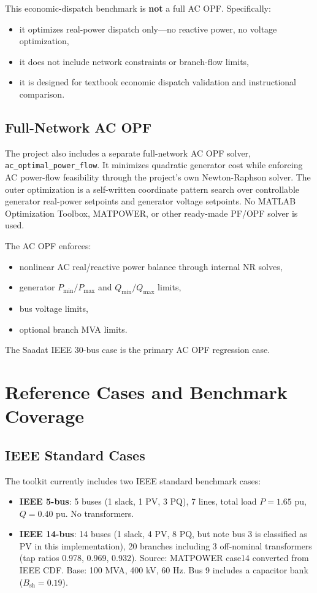 \documentclass[12pt,a4paper]{article}
\begin{document}
This economic-dispatch benchmark is \textbf{not} a full AC OPF. Specifically:
\begin{itemize}[leftmargin=1.5em]
    \item it optimizes real-power dispatch only---no reactive power, no voltage optimization,
    \item it does not include network constraints or branch-flow limits,
    \item it is designed for textbook economic dispatch validation and instructional comparison.
\end{itemize}

\subsection{Full-Network AC OPF}

The project also includes a separate full-network AC OPF solver,
\texttt{ac\_optimal\_power\_flow}. It minimizes quadratic generator cost while
enforcing AC power-flow feasibility through the project's own Newton-Raphson
solver. The outer optimization is a self-written coordinate pattern search over
controllable generator real-power setpoints and generator voltage setpoints.
No MATLAB Optimization Toolbox, MATPOWER, or other ready-made PF/OPF solver is
used.

The AC OPF enforces:
\begin{itemize}[leftmargin=1.5em]
    \item nonlinear AC real/reactive power balance through internal NR solves,
    \item generator \(P_{\min}/P_{\max}\) and \(Q_{\min}/Q_{\max}\) limits,
    \item bus voltage limits,
    \item optional branch MVA limits.
\end{itemize}

The Saadat IEEE 30-bus case is the primary AC OPF regression case.

\section{Reference Cases and Benchmark Coverage}

\subsection{IEEE Standard Cases}

The toolkit currently includes two IEEE standard benchmark cases:
\begin{itemize}[leftmargin=1.5em]
    \item \textbf{IEEE 5-bus}: 5 buses (1 slack, 1 PV, 3 PQ), 7 lines, total load $P=1.65$ pu, $Q=0.40$ pu. No transformers.
    \item \textbf{IEEE 14-bus}: 14 buses (1 slack, 4 PV, 8 PQ, but note bus 3 is classified as PV in this implementation), 20 branches including 3 off-nominal transformers (tap ratios 0.978, 0.969, 0.932). Source: MATPOWER case14 converted from IEEE CDF. Base: 100 MVA, 400 kV, 60 Hz. Bus 9 includes a capacitor bank ($B_{\text{sh}}=0.19$).
\end{itemize}
\end{document}
